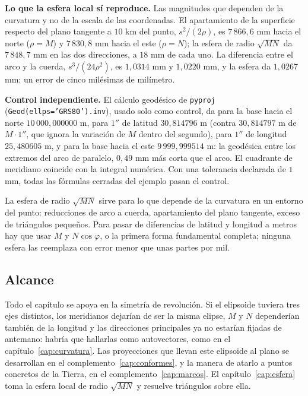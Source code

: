 \begin{ejemplo}
\textbf{Lo que la esfera local sí reproduce.} Las magnitudes que dependen de la curvatura y
no de la escala de las coordenadas. El apartamiento de la superficie respecto del plano
tangente a \(10\) km del punto, \(s^2/(2\rho)\), es \(7\,866{,}6\) mm hacia el norte
(\(\rho=M\)) y \(7\,830{,}8\) mm hacia el este (\(\rho=N\)); la esfera de radio \(\sqrt{MN}\) da
\(7\,848{,}7\) mm en las dos direcciones, a \(18\) mm de cada uno. La diferencia entre el arco y
la cuerda, \(s^3/(24\rho^2)\), es \(1{,}0314\) mm y \(1{,}0220\) mm, y la esfera da \(1{,}0267\)
mm: un error de cinco milésimas de milímetro.

\textbf{Control independiente.} El cálculo geodésico de \texttt{pyproj}
(\texttt{Geod(ellps='GRS80').inv}), usado solo como control, da para la base hacia el norte
\(10\,000{,}000000\) m, para \(1''\) de latitud \(30{,}814796\) m (contra \(30{,}814797\) m de
\(M\cdot1''\), que ignora la variación de \(M\) dentro del segundo), para \(1''\) de longitud
\(25{,}480605\) m, y para la base hacia el este \(9\,999{,}999514\) m: la geodésica entre los
extremos del arco de paralelo, \(0{,}49\) mm más corta que el arco. El cuadrante de meridiano
coincide con la integral numérica. Con una tolerancia declarada de \(1\) mm, todas las
fórmulas cerradas del ejemplo pasan el control.
\end{ejemplo}

\begin{atencion}
La esfera de radio \(\sqrt{MN}\) sirve para lo que depende de la curvatura en un entorno del
punto: reducciones de arco a cuerda, apartamiento del plano tangente, exceso de triángulos
pequeños. Para pasar de diferencias de latitud y longitud a metros hay que usar \(M\) y
\(N\cos\varphi\), o la primera forma fundamental completa; ninguna esfera las reemplaza con
error menor que unas partes por mil.
\end{atencion}

\subsection{Alcance}

Todo el capítulo se apoya en la simetría de revolución. Si el elipsoide tuviera tres ejes
distintos, los meridianos dejarían de ser la misma elipse, \(M\) y \(N\) dependerían también
de la longitud y las direcciones principales ya no estarían fijadas de antemano: habría que
hallarlas como autovectores, como en el capítulo~\ref{cap:curvatura}. Las proyecciones que
llevan este elipsoide al plano se desarrollan en el complemento~\ref{cap:conformes}, y la
manera de atarlo a puntos concretos de la Tierra, en el complemento~\ref{cap:marcos}.
El capítulo~\ref{cap:esfera} toma la esfera local de radio \(\sqrt{MN}\) y resuelve triángulos
sobre ella.

